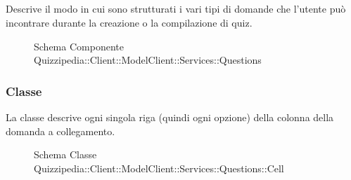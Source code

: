 \subsection{}
Descrive il modo in cui sono strutturati i vari tipi di domande che l'utente può incontrare durante la creazione o la compilazione di quiz.
\begin{figure}[H]
\centering
\noindent{}
\caption[Schema Componente Quizzipedia::Client::ModelClient::Services::Questions]{Schema Componente Quizzipedia::Client::ModelClient::Services::Questions}
\end{figure}
\subsubsection{Classe }
La classe descrive ogni singola riga (quindi ogni opzione) della colonna della domanda a collegamento.
\begin{figure}[H]
\centering
\noindent{}
\caption[Schema Classe Cell]{Schema Classe Quizzipedia::Client::ModelClient::Services::Questions::Cell}
\end{figure}
